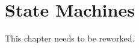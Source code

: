 \chapter{State Machines}\label{chap:state-machines}

This chapter needs to be reworked.

\clearpage

\endinput